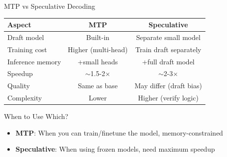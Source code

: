 \documentclass[aspectratio=169, 11pt]{beamer}
\begin{document}
\begin{frame}{MTP vs Speculative Decoding}

	\begin{center}
		\small
		\begin{tabular}{@{}lcc@{}}
			\toprule
			\textbf{Aspect} & \textbf{MTP} & \textbf{Speculative} \\
			\midrule
			Draft model       & Built-in         & Separate small model    \\
			Training cost     & Higher (multi-head) & Train draft separately \\
			Inference memory  & +small heads     & +full draft model       \\
			Speedup           & $\sim$1.5-2$\times$ & $\sim$2-3$\times$      \\
			Quality           & Same as base     & May differ (draft bias) \\
			Complexity        & Lower            & Higher (verify logic)   \\
			\bottomrule
		\end{tabular}
	\end{center}

	\begin{block}{When to Use Which?}
		\begin{itemize}
			\item \textbf{MTP}: When you can train/finetune the model, memory-constrained
			\item \textbf{Speculative}: When using frozen models, need maximum speedup
		\end{itemize}
	\end{block}

\end{frame}
\end{document}

